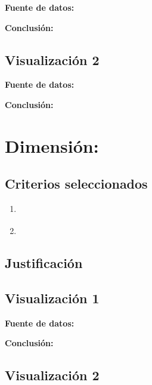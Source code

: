 \documentclass[12pt]{article}
\begin{document}
\textbf{Fuente de datos:} %

\textbf{Conclusión:} \\

\subsection*{Visualización 2}

\textbf{Fuente de datos:} %

\textbf{Conclusión:} \\


\section*{Dimensión: %
}

\subsection*{Criterios seleccionados}
\begin{enumerate}
    \item \textbf{%
    }
    \item \textbf{%
    }
\end{enumerate}

\subsection*{Justificación}

\subsection*{Visualización 1}

\textbf{Fuente de datos:} %

\textbf{Conclusión:} \\

\subsection*{Visualización 2}
\end{document}
